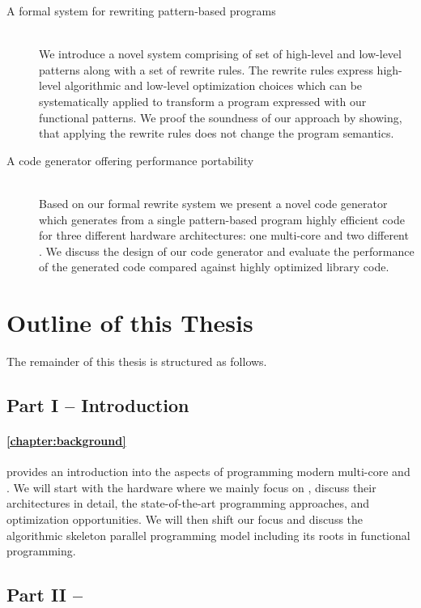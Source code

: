 \begin{description}
  \item[A formal system for rewriting pattern-based programs]\hfill\\[-1em]
    We introduce a novel system comprising of set of high-level and low-level patterns along with a set of rewrite rules.
    The rewrite rules express high-level algorithmic and low-level optimization choices which can be systematically applied to transform a program expressed with our functional patterns.
    We proof the soundness of our approach by showing, that applying the rewrite rules does not change the program semantics.

  \item[A code generator offering performance portability]\hfill\\[.25em]
    Based on our formal rewrite system we present a novel code generator which generates from a single pattern-based program highly efficient \OpenCL code for three different hardware architectures:
    one multi-core \CPU and two different \GPUs.
    We discuss the design of our code generator and evaluate the performance of the generated \OpenCL code compared against highly optimized library code.
\end{description}

\section{Outline of this Thesis}
The remainder of this thesis is structured as follows.

\subsection*{Part I -- Introduction}

\paragraph{\autoref{chapter:background}} provides an introduction into the aspects of programming modern multi-core \CPUs and \GPUs.
We will start with the hardware where we mainly focus on \GPUs, discuss their architectures in detail, the state-of-the-art programming approaches, and optimization opportunities.
We will then shift our focus and discuss the algorithmic skeleton parallel programming model including its roots in functional programming.


\subsection*{Part II -- \SkelCL}

